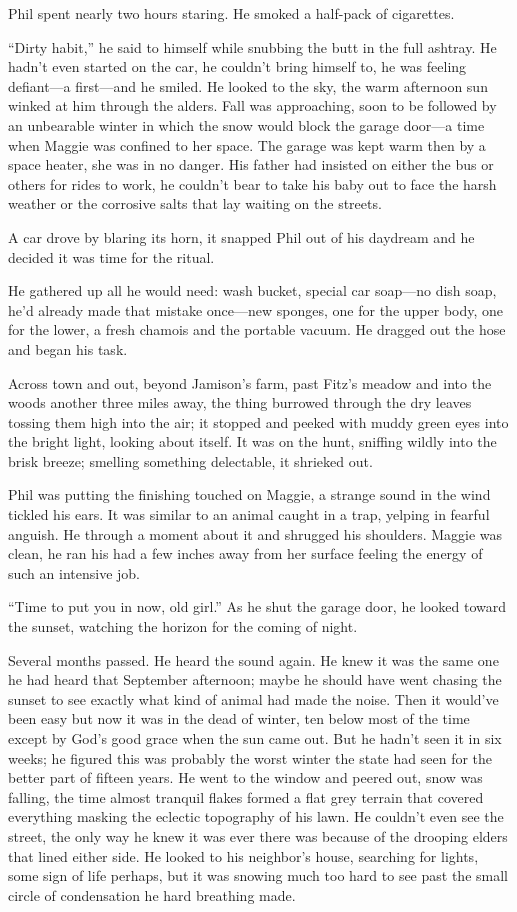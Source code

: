\documentclass[
]{article}
\begin{document}
Phil spent nearly two hours staring. He smoked a half-pack of
cigarettes.

``Dirty habit,'' he said to himself while snubbing the butt in the full
ashtray. He hadn't even started on the car, he couldn't bring himself
to, he was feeling defiant---a first---and he smiled. He looked to the
sky, the warm afternoon sun winked at him through the alders. Fall was
approaching, soon to be followed by an unbearable winter in which the
snow would block the garage door---a time when Maggie was confined to
her space. The garage was kept warm then by a space heater, she was in
no danger. His father had insisted on either the bus or others for rides
to work, he couldn't bear to take his baby out to face the harsh weather
or the corrosive salts that lay waiting on the streets.

A car drove by blaring its horn, it snapped Phil out of his daydream and
he decided it was time for the ritual.

He gathered up all he would need: wash bucket, special car soap---no
dish soap, he'd already made that mistake once---new sponges, one for
the upper body, one for the lower, a fresh chamois and the portable
vacuum. He dragged out the hose and began his task.

Across town and out, beyond Jamison's farm, past Fitz's meadow and into
the woods another three miles away, the thing burrowed through the dry
leaves tossing them high into the air; it stopped and peeked with muddy
green eyes into the bright light, looking about itself. It was on the
hunt, sniffing wildly into the brisk breeze; smelling something
delectable, it shrieked out.

Phil was putting the finishing touched on Maggie, a strange sound in the
wind tickled his ears. It was similar to an animal caught in a trap,
yelping in fearful anguish. He through a moment about it and shrugged
his shoulders. Maggie was clean, he ran his had a few inches away from
her surface feeling the energy of such an intensive job.

``Time to put you in now, old girl.'' As he shut the garage door, he
looked toward the sunset, watching the horizon for the coming of night.

Several months passed. He heard the sound again. He knew it was the same
one he had heard that September afternoon; maybe he should have went
chasing the sunset to see exactly what kind of animal had made the
noise. Then it would've been easy but now it was in the dead of winter,
ten below most of the time except by God's good grace when the sun came
out. But he hadn't seen it in six weeks; he figured this was probably
the worst winter the state had seen for the better part of fifteen
years. He went to the window and peered out, snow was falling, the time
almost tranquil flakes formed a flat grey terrain that covered
everything masking the eclectic topography of his lawn. He couldn't even
see the street, the only way he knew it was ever there was because of
the drooping elders that lined either side. He looked to his neighbor's
house, searching for lights, some sign of life perhaps, but it was
snowing much too hard to see past the small circle of condensation he
hard breathing made.
\end{document}
